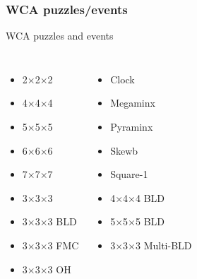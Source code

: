 \documentclass[10pt]{beamer}
\begin{document}
            \subsubsection{WCA puzzles/events}

                \begin{frame}{WCA puzzles and events}
                    \begin{columns}[c] 
                            \begin{itemize}
                                \item<1-> 2$\times$2$\times$2 
                                \item<2-> 4$\times$4$\times$4 
                                \item<3-> 5$\times$5$\times$5 
                                \item<4-> 6$\times$6$\times$6 
                                \item<5-> 7$\times$7$\times$7 
                                \item<6-> 3$\times$3$\times$3 
                                \item<7-> 3$\times$3$\times$3 BLD 
                                \item<8-> 3$\times$3$\times$3 FMC 
                                \item<9-> 3$\times$3$\times$3 OH 
                            \end{itemize}
                            \begin{itemize}
                                \item<10-> Clock 
                                \item<11-> Megaminx 
                                \item<12-> Pyraminx 
                                \item<13-> Skewb 
                                \item<14-> Square-1 
                                \item<15-> 4$\times$4$\times$4 BLD 
                                \item<16-> 5$\times$5$\times$5 BLD 
                                \item<17-> 3$\times$3$\times$3 Multi-BLD
                            \end{itemize}


\end{columns}
\end{frame}
\end{document}
